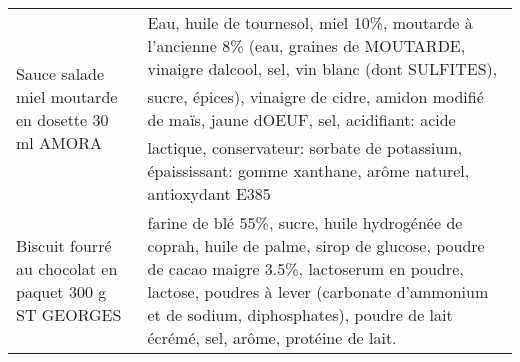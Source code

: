 \begin{longtable}{p{5cm}p{10cm}}
                                                        Sauce salade miel moutarde en dosette 30 ml AMORA &                                                                                                                                                                                                                                                                                                                                                                                                                                                                                                                                                                                                                                                                                   Eau, huile de tournesol, miel 10\%, moutarde à l'ancienne 8\% (eau, graines de MOUTARDE, vinaigre dalcool, sel, vin blanc (dont SULFITES), sucre, épices), vinaigre de cidre, amidon  modifié de maïs, jaune dOEUF, sel, acidifiant: acide lactique, conservateur: sorbate de potassium, épaississant: gomme xanthane, arôme naturel, antioxydant E385 \\
                                                    Biscuit fourré au chocolat en paquet 300 g ST GEORGES &                                                                                                                                                                                                                                                                                                                                                                                                                                                                                                                                                                                                                                                                                                                                                              farine de blé 55\%, sucre, huile hydrogénée de coprah, huile de palme, sirop de glucose, poudre de cacao maigre 3.5\%, lactoserum en poudre, lactose, poudres à lever (carbonate d'ammonium et de sodium, diphosphates), poudre de lait écrémé, sel, arôme, protéine de lait. \\

\end{longtable}
